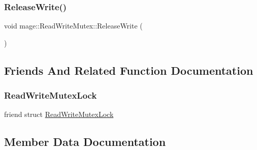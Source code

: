 \hypertarget{classmage_1_1_read_write_mutex_ad0fd296bdaa212f54a58372c8dfe1d1d}{}\label{classmage_1_1_read_write_mutex_ad0fd296bdaa212f54a58372c8dfe1d1d} 
\subsubsection{\texorpdfstring{Release\+Write()}{ReleaseWrite()}}
{\footnotesize\ttfamily void mage\+::\+Read\+Write\+Mutex\+::\+Release\+Write (\begin{DoxyParamCaption}{ }\end{DoxyParamCaption})\hspace{0.3cm}{\ttfamily [private]}}



\subsection{Friends And Related Function Documentation}
\hypertarget{classmage_1_1_read_write_mutex_a7ae207fc659160d3c55a5ba1468007f7}{}\label{classmage_1_1_read_write_mutex_a7ae207fc659160d3c55a5ba1468007f7} 
\subsubsection{\texorpdfstring{Read\+Write\+Mutex\+Lock}{ReadWriteMutexLock}}
{\footnotesize\ttfamily friend struct \hyperlink{structmage_1_1_read_write_mutex_lock}{Read\+Write\+Mutex\+Lock}\hspace{0.3cm}{\ttfamily [friend]}}



\subsection{Member Data Documentation}
\hypertarget{classmage_1_1_read_write_mutex_a1e0ad98e517236170faae5b27decfdce}{}\label{classmage_1_1_read_write_mutex_a1e0ad98e517236170faae5b27decfdce} 
